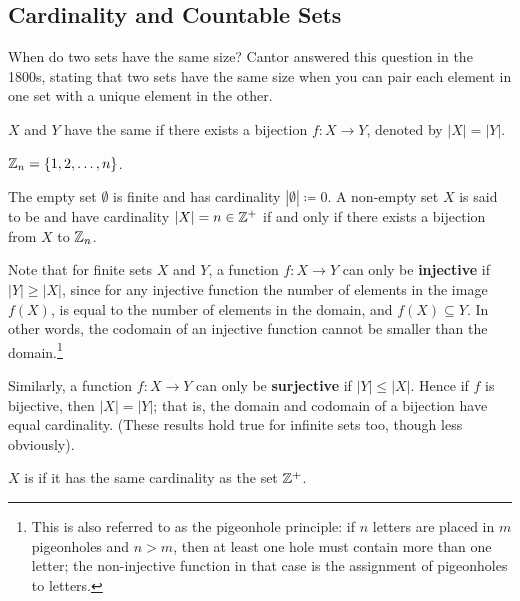 \subsection{Cardinality and Countable Sets}
When do two sets have the same size? Cantor answered this question in the 1800s, stating that two sets have the same size when you can pair each element in one set with a unique element in the other.

\begin{definition}
$X$ and $Y$ have the same  if there exists a bijection $f:X\to Y$, denoted by $|X|=|Y|$.
\end{definition}

\begin{notation}
$\mathbb Z_n=\{1,2,\dots,n\}$.
\end{notation}

\begin{definition}
The empty set $\emptyset$ is finite and has cardinality $|\emptyset|\coloneqq0$. A non-empty set $X$ is said to be  and have cardinality $|X|=n\in\mathbb Z^+$ if and only if there exists a bijection from $X$ to $\mathbb Z_n$.
\end{definition}

\begin{remark}
Note that for finite sets $X$ and $Y$, a function $f:X \to Y$ can only be \textbf{injective} if $|Y| \ge |X|$, since for any injective function the number of elements in the image $f(X)$, is equal to the number of elements in the domain, and $f(X) \subseteq Y$. In other words, the codomain of an injective function cannot be smaller than the domain.\footnote{This is also referred to as the pigeonhole principle: if $n$ letters are placed in $m$ pigeonholes and $n>m$, then at least one hole must contain more than one letter; the non-injective function in that case is the assignment of pigeonholes to letters.}

Similarly, a function $f:X \to Y$ can only be \textbf{surjective} if $|Y| \le |X|$. Hence if $f$ is bijective, then $|X|=|Y|$; that is, the domain and codomain of a bijection have equal cardinality. (These results hold true for infinite sets too, though less obviously).
\end{remark}


\begin{definition}
$X$ is  if it has the same cardinality as the set $\mathbb Z^+$.
\end{definition}


